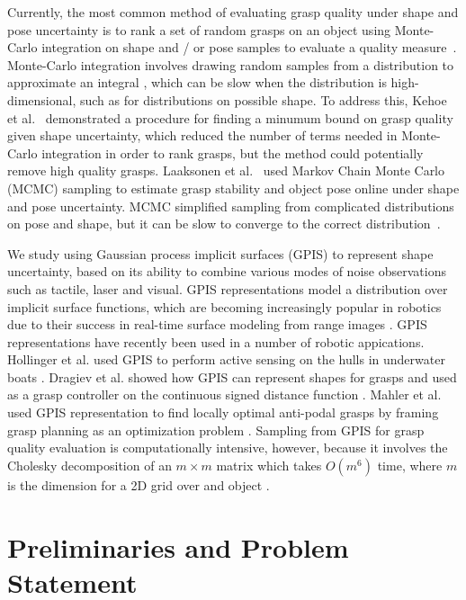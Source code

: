 \documentclass[letterpaper, 10 pt, conference]{ieeeconf}  %
\begin{document}
Currently, the most common method of evaluating grasp quality under shape and pose uncertainty is to rank a set of random grasps on an object using Monte-Carlo integration on shape and / or pose samples to evaluate a quality measure~\cite{christopoulos2007handling, kehoe2012estimating, kehoe2012toward}.
Monte-Carlo integration involves drawing random samples from a distribution to approximate an integral \cite{caflisch1998monte}, which can be slow when the distribution is high-dimensional, such as for distributions on possible shape.
To address this, Kehoe et al.~\cite{kehoe2012estimating, kehoe2012toward} demonstrated a procedure for finding a minumum bound on grasp quality given shape uncertainty, which reduced the number of terms needed in Monte-Carlo integration in order to rank grasps, but the method could potentially remove high quality grasps.
Laaksonen et al.~\cite{laaksonen2012probabilistic} used Markov Chain Monte Carlo (MCMC) sampling to estimate grasp stability and object pose online under shape and pose uncertainty.
MCMC simplified sampling from complicated distributions on pose and shape, but it can be slow to converge to the correct distribution~\cite{andrieu2003introduction}.

We study using Gaussian process implicit surfaces (GPIS) to represent shape uncertainty, based on its ability to combine various modes of noise observations such as tactile, laser and visual.
GPIS representations model a distribution over implicit surface functions, which are becoming increasingly popular in robotics due to their success in real-time surface modeling from range images \cite{curless1996volumetric, newcombe2011kinectfusion}.
GPIS representations have recently been used in a number of robotic appications.
Hollinger et al. used GPIS to perform active sensing on the hulls in underwater boats \cite{hollinger2013}.
Dragiev et al. showed how GPIS can represent shapes for grasps and used  as a grasp controller on the continuous signed distance function \cite{dragiev2011}.
Mahler et al. used GPIS representation to find locally optimal anti-podal grasps by framing grasp planning as an optimization problem \cite{jeff}. 
Sampling from GPIS for grasp quality evaluation is computationally intensive, however, because it involves the Cholesky decomposition of an $m \times m$ matrix which takes $O(m^6)$ time, where $m$ is the dimension for a 2D grid over and object \cite{morrison1990multivariate}.


\section{Preliminaries and Problem Statement}
\end{document}
